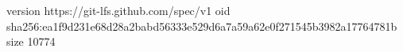 version https://git-lfs.github.com/spec/v1
oid sha256:ea1f9d231e68d28a2babd56333e529d6a7a59a62e0f271545b3982a17764781b
size 10774
